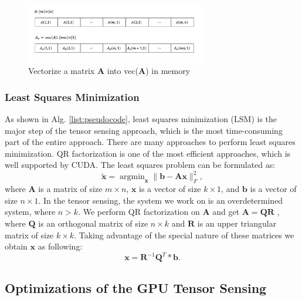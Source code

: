 \documentclass[futureinternet,article,submit,moreauthors,pdftex,10pt,a4paper]{Definitions/mdpi}
\theoremstyle{plain}
\theoremstyle{definition}
\theoremstyle{remark}
\begin{document}
\begin{figure}[H]
\centering
\includegraphics[width=0.7\textwidth]{vec2mat.png}
\caption{Vectorize a matrix $\mathbf{A}$ into vec($\mathbf{A}$) in memory}
\label{Fig:vec2mat}
\end{figure}

\subsubsection{Least Squares Minimization}
As shown in Alg. \ref{list:pseudocode}, least squares minimization (LSM) is the major step of the tensor sensing approach, which is the most time-consuming part of the entire approach. There are many approaches to perform least squares minimization. QR factorization is one of the most efficient approaches, which is well supported by CUDA. The least squares problem can be formulated as:
\begin{equation}
\widetilde{\mathbf{x}} = \mathop{\arg \min}_{\mathbf{x}} \| \mathbf{b} - \mathbf{A} \mathbf{x} \|^2_F,
\end{equation}
where $\mathbf{A}$ is a matrix of size $m \times n$, $\mathbf{x}$ is a vector
of size $k \times 1$, and $\mathbf{b}$ is a vector of size $n \times 1$. In the tensor
sensing, the system we work on is an overdetermined system, where $n >
 k$.
 We perform QR factorization on $\mathbf{A}$ and get $\mathbf{A} = \mathbf{Q}\mathbf{R}$ , where $\mathbf{Q}$ is an
 orthogonal matrix of size $n \times k $ and $\mathbf{R}$ is an upper triangular matrix of size $k \times k$. Taking advantage of the special nature of these matrices we obtain $\mathbf{x}$
as following:
\begin{equation}
\mathbf{x} = \mathbf{R}^{-1}\mathbf{Q}^{T} \ast \mathbf{b}.
\end{equation}

\subsection{Optimizations of the GPU Tensor Sensing}
\label{SEC_OPT}
\end{document}
